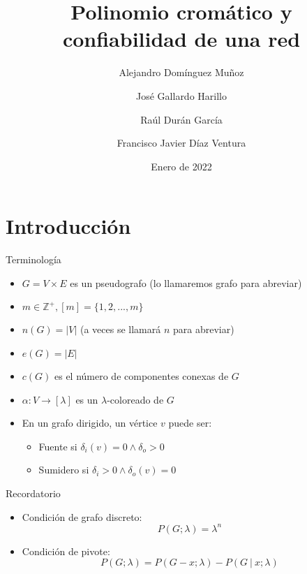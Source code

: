 \documentclass{beamer}
\title{Polinomio cromático y confiabilidad de una red}
\author{
    Alejandro Domínguez Muñoz
    \and\break
    José Gallardo Harillo
    \and\break
    Raúl Durán García
    \and\break
    Francisco Javier Díaz Ventura
}
\institute{Universidad de Sevilla}
\date{Enero de 2022}
\begin{document}
\frame{\titlepage}

\frame{\tableofcontents}

\section{Introducción}

\begin{frame}{Terminología}
    \begin{itemize}
        \item $G = V \times E$ es un pseudografo (lo llamaremos grafo para abreviar)
        \item $m \in \mathbb{Z}^+, [m] = \{1,2,...,m\}$
        \item $n(G) = |V|$ (a veces se llamará $n$ para abreviar)
        \item $e(G) = |E|$
        \item $c(G)$ es el número de componentes conexas de $G$
        \item $\alpha : V \to [\lambda]$ es un $\lambda$-coloreado de $G$
        \item En un grafo dirigido, un vértice $v$ puede ser:
        \begin{itemize}
            \item Fuente si $\delta_i(v) = 0 \land \delta_o > 0$
            \item Sumidero si $\delta_i > 0 \land \delta_o(v) = 0$
        \end{itemize}
    \end{itemize}
\end{frame}

\begin{frame}{Recordatorio}
    \begin{itemize}
        \item Condición de grafo discreto:
        \begin{equation*}
            P(G; \lambda) = \lambda^n
        \end{equation*}
        \item Condición de pivote:
        \begin{equation*}
            P(G; \lambda) = P(G-x; \lambda) - P(G\ |\ x; \lambda)
        \end{equation*}
    \end{itemize}
\end{frame}
\end{document}

